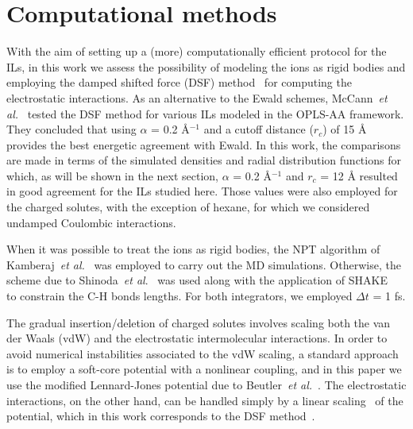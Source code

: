 \documentclass[3p,twocolumn]{elsarticle}
\begin{document}
\section{Computational methods}
\label{sec:sim_details}

With the aim of setting up a (more) computationally efficient protocol for the ILs, in this work we assess the possibility of modeling the ions as rigid bodies and employing the damped shifted force (DSF) method~\cite{Fennell2006} for computing the electrostatic interactions. As an alternative to the Ewald schemes, McCann~\textit{et al.}~\cite{McCann_2013} tested the DSF method for various ILs modeled in the OPLS-AA framework. They concluded that using $\alpha$ = 0.2 {\AA}$^{-1}$ and a cutoff distance ($r_c$) of 15 {\AA} provides the best energetic agreement with Ewald. In this work, the comparisons are made in terms of the simulated densities and radial distribution functions for which, as will be shown in the next section, $\alpha$ = 0.2 {\AA}$^{-1}$ and $r_c$ = 12 {\AA} resulted in good agreement for the ILs studied here. Those values were also employed for the charged solutes, with the exception of hexane, for which we considered undamped Coulombic interactions.

When it was possible to treat the ions as rigid bodies, the NPT algorithm of Kamberaj~\textit{et al.}~\cite{Kamberaj_2005} was employed to carry out the MD simulations. Otherwise, the scheme due to Shinoda~\textit{et al}.~\cite{Shinoda2004} was used along with the application of SHAKE~\cite{Ryckaert1977} to constrain the C-H bonds lengths. For both integrators, we employed $\Delta t$ = 1 fs.

The gradual insertion/deletion of charged solutes involves scaling both the van der Waals (vdW) and the electrostatic intermolecular interactions. In order to avoid numerical instabilities associated to the vdW scaling, a standard approach is to employ a soft-core potential with a nonlinear coupling, and in this paper we use the modified Lennard-Jones potential due to Beutler~\textit{et al.}~\cite{Beutler_1994}. The electrostatic interactions, on the other hand, can be handled simply by a linear scaling~\cite{Naden_2015} of the potential, which in this work corresponds to the DSF method~\cite{Fennell2006}.
\end{document}
